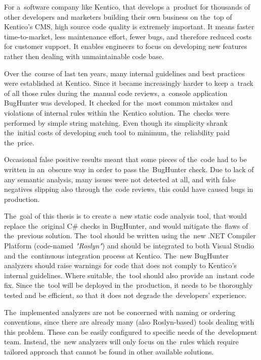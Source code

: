 \documentclass[
  digital, %
  table,   %
  lof,     %
  lot,     %
  oneside,
]{fithesis3}
\begin{document}
For a~software company like Kentico, that develops a~product for thousands of other developers and marketers building their own business on the~top of Kentico's CMS, high source code quality is extremely important. It means faster time-to-market, less maintenance effort, fewer bugs, and therefore reduced costs for customer support. It enables engineers to focus on developing new features rather then dealing with unmaintainable code base. 


Over the~course of last ten years, many internal guidelines and best practices were established at Kentico. Since it became increasingly harder to keep a~track of all those rules during the~manual code reviews, a~console application BugHunter was developed. It checked for the~most common mistakes and violations of internal rules within the~Kentico solution. The~checks were performed by simple string matching. Even though its simplicity shrank the~initial costs of developing such tool to minimum, the~reliability paid the~price. 

Occasional false positive results meant that some pieces of the~code had to be written in an~obscure way in order to pass the~BugHunter check. Due to lack of any semantic analysis, many issues were not detected at all, and with false negatives slipping also through the~code reviews, this could have caused bugs in production. 

The~goal of this thesis is to create a~new static code analysis tool, that would replace the~original C\# checks in BugHunter, and would mitigate the~flaws of the~previous solution. The~tool should be written using the~new .NET Compiler Platform (code-named \textit{"Roslyn"}) and should be integrated to both Visual Studio and the~continuous integration process at Kentico. The~new BugHunter analyzers should raise warnings for code that does not comply to Kentico's internal guidelines. Where suitable, the~tool should also provide an~instant code fix. Since the~tool will be deployed in the~production, it needs to be thoroughly tested and be efficient, so that it does not degrade the~developers' experience.

The~implemented analyzers are not be concerned with naming or ordering conventions, since there are already many (also Roslyn-based) tools dealing with this problem. These can be easily configured to specific needs of the~development team. Instead, the~new analyzers will only focus on the~rules which require tailored approach that cannot be found in other available solutions. 
\end{document}
